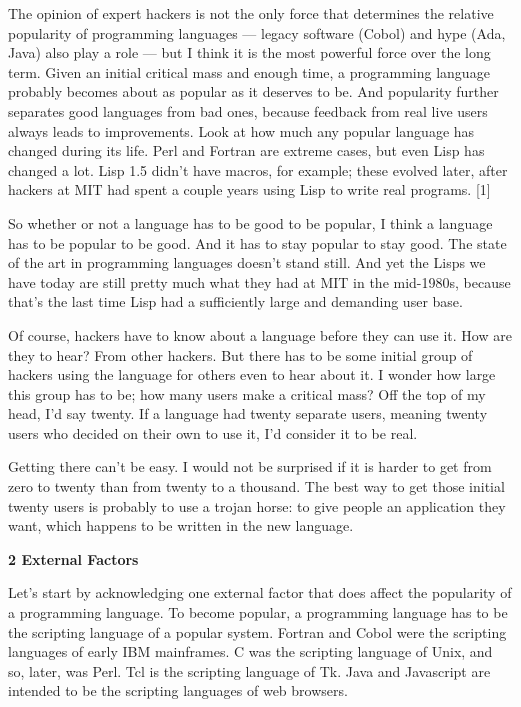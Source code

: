 The opinion of expert hackers is not the only force that determines the
relative popularity of programming languages --- legacy software (Cobol)
and hype (Ada, Java) also play a role --- but I think it is the most
powerful force over the long term. Given an initial critical mass and
enough time, a programming language probably becomes about as popular as
it deserves to be. And popularity further separates good languages from
bad ones, because feedback from real live users always leads to
improvements. Look at how much any popular language has changed during
its life. Perl and Fortran are extreme cases, but even Lisp has changed
a lot. Lisp 1.5 didn't have macros, for example; these evolved later,
after hackers at MIT had spent a couple years using Lisp to write real
programs. {[}1{]}

So whether or not a language has to be good to be popular, I think a
language has to be popular to be good. And it has to stay popular to
stay good. The state of the art in programming languages doesn't stand
still. And yet the Lisps we have today are still pretty much what they
had at MIT in the mid-1980s, because that's the last time Lisp had a
sufficiently large and demanding user base.

Of course, hackers have to know about a language before they can use it.
How are they to hear? From other hackers. But there has to be some
initial group of hackers using the language for others even to hear
about it. I wonder how large this group has to be; how many users make a
critical mass? Off the top of my head, I'd say twenty. If a language had
twenty separate users, meaning twenty users who decided on their own to
use it, I'd consider it to be real.

Getting there can't be easy. I would not be surprised if it is harder to
get from zero to twenty than from twenty to a thousand. The best way to
get those initial twenty users is probably to use a trojan horse: to
give people an application they want, which happens to be written in the
new language.

\textbf{2 External Factors}

Let's start by acknowledging one external factor that does affect the
popularity of a programming language. To become popular, a programming
language has to be the scripting language of a popular system. Fortran
and Cobol were the scripting languages of early IBM mainframes. C was
the scripting language of Unix, and so, later, was Perl. Tcl is the
scripting language of Tk. Java and Javascript are intended to be the
scripting languages of web browsers.

